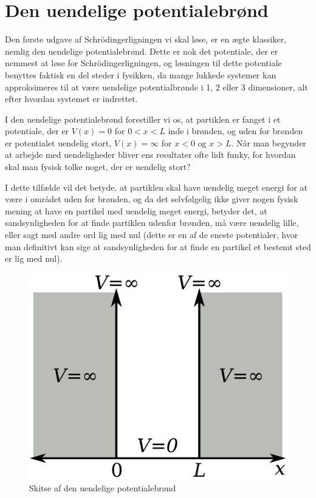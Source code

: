\documentclass[../Kvantemekanik.tex]{subfiles}
\begin{document}
\section{Den uendelige potentialebrønd}
Den første udgave af Schrödingerligningen vi skal løse, er en ægte klassiker, nemlig den uendelige potentialebrønd. Dette er nok det potentiale, der er nemmest at løse for Schrödingerligningen, og løsningen til dette potentiale benyttes faktisk en del steder i fysikken, da mange lukkede systemer kan approksimeres til at være uendelige potentialbrønde i 1, 2 eller 3 dimensioner, alt efter hvordan systemet er indrettet.

I den uendelige potentialebrønd forestiller vi os, at partiklen er fanget i et potentiale, der er $V(x)=0$ for $0<x<L$ inde i brønden, og uden for brønden er potentialet uendelig stort, $V(x)=\infty$ for $x<0$ og $x>L$. Når man begynder at arbejde med uendeligheder bliver ens resultater ofte lidt funky, for hvordan skal man fysisk tolke noget, der er uendelig stort?

I dette tilfælde vil det betyde, at partiklen skal have uendelig meget energi for at være i området uden for brønden, og da det selvfølgelig ikke giver nogen fysisk mening at have en partikel med uendelig meget energi, betyder det, at sandsynligheden for at finde partiklen udenfor brønden, må være uendelig lille, eller sagt med andre ord lig med nul (dette er en af de eneste potentialer, hvor man definitivt kan sige at sandsynligheden for at finde en partikel et bestemt sted er lig med nul).
\begin{figure}[h]
    \centering
    \includegraphics[scale=0.13]{Kvantemekanik/billeder/uendelig.png}
    \caption{Skitse af den uendelige potentialebrønd}
    \label{fig:uendelig}
\end{figure}
\end{document}
